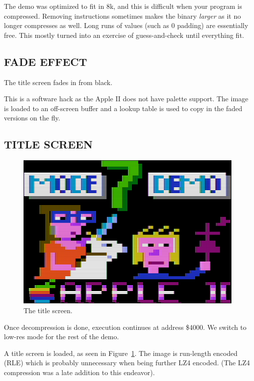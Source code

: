 \documentclass[twocolumn]{article}
\begin{document}
The demo was optimized to fit in 8k, and this is difficult when your program
is compressed.
Removing instructions sometimes makes the binary {\em larger} as it no longer
compresses as well.
Long runs of values (such as 0 padding) are essentially free.
This mostly turned into an exercise of guess-and-check until everything fit.

\subsection{FADE EFFECT}

The title screen fades in from black.

This is a software hack as the Apple II does not have palette support.
The image is loaded to an off-screen buffer and a lookup table is used to
copy in the faded versions on the fly.

\subsection{TITLE SCREEN}

\begin{figure}[tb]
\begin{center}
\includegraphics[width=\columnwidth]{figures/mode7_demo_title.png}
\end{center}
\caption{The title screen.\label{fig:title}}
\end{figure}

Once decompression is done, execution continues at address \$4000.
We switch to low-res mode for the rest of the demo.

A title screen is loaded, as seen in Figure~\ref{fig:title}.
The image is run-length encoded (RLE) which is
probably unnecessary when being further LZ4 encoded.
(The LZ4 compression was a late addition to this endeavor).
\end{document}
